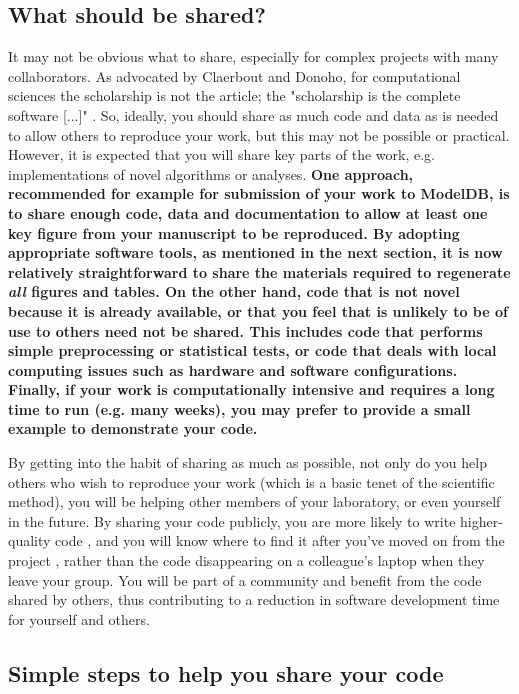 \documentclass[11pt]{article}
\begin{document}
\subsection*{What should be shared?}

It may not be obvious what to share, especially for complex projects
with many collaborators.  As advocated by Claerbout and Donoho, for
computational sciences the scholarship is not the article; the
"scholarship is the complete software [...]"
\cite{claerbout_electronic_1992,donoho_invitation_2010}.  So, ideally,
you should share as much code and data as is needed to allow others to
reproduce your work, but this may not be possible or practical.
However, it is expected that you will share key parts of the work,
e.g. implementations of novel algorithms or analyses.  \textbf{One
  approach, recommended for example for submission of your work to
  ModelDB\cite{modeldb}, is to share enough code, data and
  documentation to allow at least one key figure from your manuscript
  to be reproduced.  By adopting appropriate software tools, as
  mentioned in the next section, it is now relatively straightforward
  to share the materials required to regenerate \textit{all} figures
  and tables.  On the other hand, code that is not novel because it is
  already available, or that you feel that is unlikely to be of use to
  others need not be shared.  This includes code that performs simple
  preprocessing or statistical tests, or code that deals with local
  computing issues such as hardware and software configurations.
  Finally, if your work is computationally intensive and requires a
  long time to run (e.g. many weeks), you may prefer to provide a
  small example to demonstrate your code.}

By getting into the habit of sharing as much as possible, not only do
you help others who wish to reproduce your work (which is a basic
tenet of the scientific method), you will be helping other members of
your laboratory, or even yourself in the future.  By sharing your code
publicly, you are more likely to write higher-quality code
\cite{Easterbrook2014}, and you will know where to find it after
you've moved on from the project \cite{Halchenko2015}, rather than the
code disappearing on a colleague's laptop when they leave your group.
You will be part of a community and benefit from the code shared by
others, thus contributing to a reduction in software development time
for yourself and others.


\subsection*{Simple steps to help you share your code}
\end{document}

